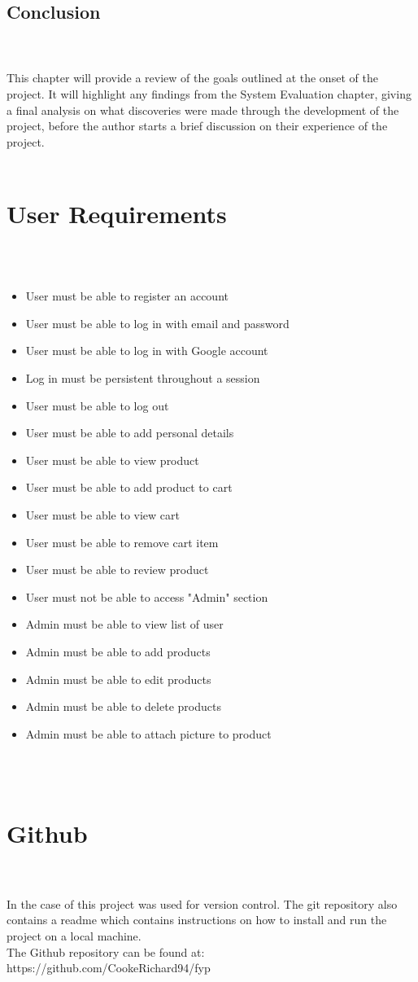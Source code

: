 \subsection{Conclusion} \\ \\
This chapter will provide a review of the goals outlined at the onset of the project. It will highlight any findings from the System Evaluation chapter, giving a final analysis on what discoveries were made through the development of the project, before the author starts a brief discussion on their experience of the project. \\ \\ 

\section{User Requirements} \\ \\
\begin{itemize}
	\item User must be able to register an account
	\item User must be able to log in with email and password
	\item User must be able to log in with Google account
	\item Log in must be persistent throughout a session
	\item User must be able to log out
	\item User must be able to add personal details
	\item User must be able to view product
	\item User must be able to add product to cart
	\item User must be able to view cart
	\item User must be able to remove cart item
	\item User must be able to review product
	\item User must not be able to access "Admin" section
	\item Admin must be able to view list of user
	\item Admin must be able to add products
	\item Admin must be able to edit products
	\item Admin must be able to delete products
	\item Admin must be able to attach picture to product
\end{itemize} \\ \\

\section{Github} \\ \\
In the case of this project was used for version control. The git repository also contains a readme which contains instructions on how to install and run the project on a local machine. \\
The Github repository can be found at: \\
https://github.com/CookeRichard94/fyp
